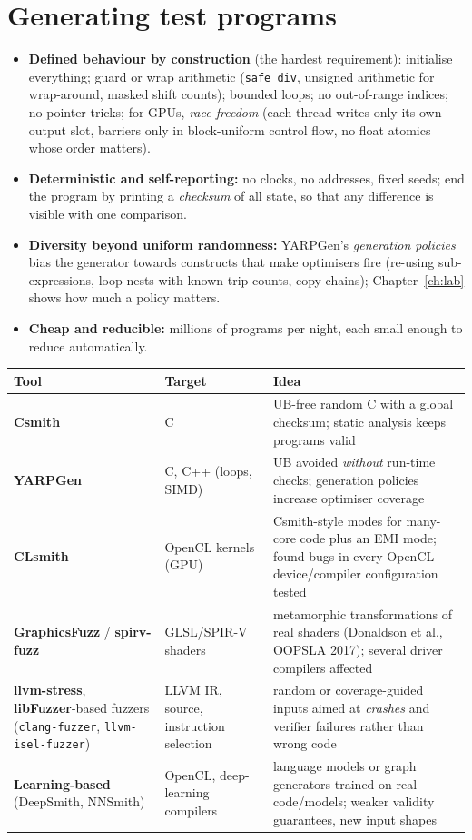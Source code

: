\documentclass[10pt,a4paper,openany,oneside]{report}
\newcommand{\prio}[1]{\texorpdfstring{\ifcase#1\or{\color{gold}\ding{72}}\or{\color{gold}\ding{72}\ding{72}}\or{\color{gold}\ding{72}\ding{72}\ding{72}}\fi}{}}
\begin{document}
\section{Generating test programs \prio{3}}
\begin{itemize}[nosep]
\item \textbf{Defined behaviour by construction} (the hardest requirement): initialise everything; guard or wrap arithmetic (\texttt{safe\_div}, unsigned arithmetic for wrap-around, masked shift counts); bounded loops; no out-of-range indices; no pointer tricks; for GPUs, \emph{race freedom} (each thread writes only its own output slot, barriers only in block-uniform control flow, no float atomics whose order matters).
\item \textbf{Deterministic and self-reporting:} no clocks, no addresses, fixed seeds; end the program by printing a \emph{checksum} of all state, so that any difference is visible with one comparison.
\item \textbf{Diversity beyond uniform randomness:} YARPGen's \emph{generation policies} bias the generator towards constructs that make optimisers fire (re-using sub-expressions, loop nests with known trip counts, copy chains); Chapter~\ref{ch:lab} shows how much a policy matters.
\item \textbf{Cheap and reducible:} millions of programs per night, each small enough to reduce automatically.
\end{itemize}
\begin{center}\small
\begin{xltabular}{\textwidth}{@{}L{3.1cm}L{3.2cm}Y@{}}
\toprule
\textbf{Tool} & \textbf{Target} & \textbf{Idea}\\
\midrule\endhead
\textbf{Csmith} & C & UB-free random C with a global checksum; static analysis keeps programs valid\\
\textbf{YARPGen} & C, C++ (loops, SIMD) & UB avoided \emph{without} run-time checks; generation policies increase optimiser coverage\\
\textbf{CLsmith} & OpenCL kernels (GPU) & Csmith-style modes for many-core code plus an EMI mode; found bugs in every OpenCL device/compiler configuration tested\\
\textbf{GraphicsFuzz} / \textbf{spirv-fuzz} & GLSL/SPIR-V shaders & metamorphic transformations of real shaders (Donaldson et al., OOPSLA 2017); several driver compilers affected\\
\textbf{llvm-stress}, \textbf{libFuzzer}-based fuzzers (\texttt{clang-fuzzer}, \texttt{llvm-isel-fuzzer}) & LLVM IR, source, instruction selection & random or coverage-guided inputs aimed at \emph{crashes} and verifier failures rather than wrong code\\
\textbf{Learning-based} (DeepSmith, NNSmith) & OpenCL, deep-learning compilers & language models or graph generators trained on real code/models; weaker validity guarantees, new input shapes\\
\bottomrule
\end{xltabular}
\end{center}
\end{document}
